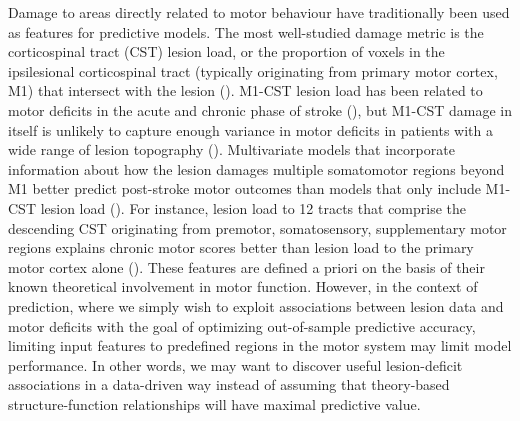 \documentclass[10pt]{article}
\begin{document}
Damage to areas directly related to motor behaviour have traditionally been used as features for predictive models. The most well-studied damage metric is the corticospinal tract (CST) lesion load, or the proportion of voxels in the ipsilesional corticospinal tract (typically originating from primary motor cortex, M1) that intersect with the lesion (\cite{Zhu2010-qh, Feng2015-du, Findlater2019-je, Lam2018-xh, Pineiro2000-dv}). M1-CST lesion load has been related to motor deficits in the acute and chronic phase of stroke (\cite{Stinear2017-eg, Kim2017-xe}), but M1-CST damage in itself is unlikely to capture enough variance in motor deficits in patients with a wide range of lesion topography (\cite{Findlater2019-je}). Multivariate models that incorporate information about how the lesion damages multiple somatomotor regions beyond M1 better predict post-stroke motor outcomes than models that only include M1-CST lesion load (\cite{Ito2022-em,  Rondina2016-ds, Rondina2017-ij, Schulz2012-yy}). For instance, lesion load to 12 tracts that comprise the descending CST originating from premotor, somatosensory, supplementary motor regions explains chronic motor scores better than lesion load to the primary motor cortex alone (\cite{Ito2022-em}). These features are defined a priori on the basis of their known theoretical involvement in motor function. However, in the context of prediction, where we simply wish to exploit associations between lesion data and motor deficits with the goal of optimizing out-of-sample predictive accuracy, limiting input features to predefined regions in the motor system may limit model performance. In other words, we may want to discover useful lesion-deficit associations in a data-driven way instead of assuming that theory-based structure-function relationships will have maximal predictive value.
\end{document}
